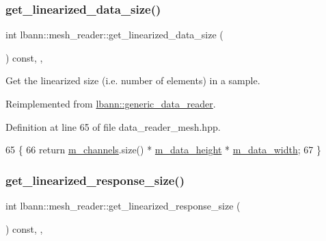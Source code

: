 \subsubsection{\texorpdfstring{get\+\_\+linearized\+\_\+data\+\_\+size()}{get\_linearized\_data\_size()}}
{\footnotesize\ttfamily int lbann\+::mesh\+\_\+reader\+::get\+\_\+linearized\+\_\+data\+\_\+size (\begin{DoxyParamCaption}{ }\end{DoxyParamCaption}) const\hspace{0.3cm}{\ttfamily [inline]}, {\ttfamily [override]}, {\ttfamily [virtual]}}



Get the linearized size (i.\+e. number of elements) in a sample. 



Reimplemented from \hyperlink{classlbann_1_1generic__data__reader_a246a719477c8c7b6122d41b6f5618d41}{lbann\+::generic\+\_\+data\+\_\+reader}.



Definition at line 65 of file data\+\_\+reader\+\_\+mesh.\+hpp.


\begin{DoxyCode}
65                                                 \{
66     \textcolor{keywordflow}{return} \hyperlink{classlbann_1_1mesh__reader_a9260add45b0421acb0ab28dd8f6d8cc6}{m\_channels}.size() * \hyperlink{classlbann_1_1mesh__reader_aeb4e0df4e0be56244df5b663e2940d11}{m\_data\_height} * 
      \hyperlink{classlbann_1_1mesh__reader_a8e16a565b0afd3097a0b6fe31a94641e}{m\_data\_width};
67   \}
\end{DoxyCode}
\mbox{\label{classlbann_1_1mesh__reader_a52b64ae05dc20d8173e50019e2a3e6ce}} 
\subsubsection{\texorpdfstring{get\+\_\+linearized\+\_\+response\+\_\+size()}{get\_linearized\_response\_size()}}
{\footnotesize\ttfamily int lbann\+::mesh\+\_\+reader\+::get\+\_\+linearized\+\_\+response\+\_\+size (\begin{DoxyParamCaption}{ }\end{DoxyParamCaption}) const\hspace{0.3cm}{\ttfamily [inline]}, {\ttfamily [override]}, {\ttfamily [virtual]}}



